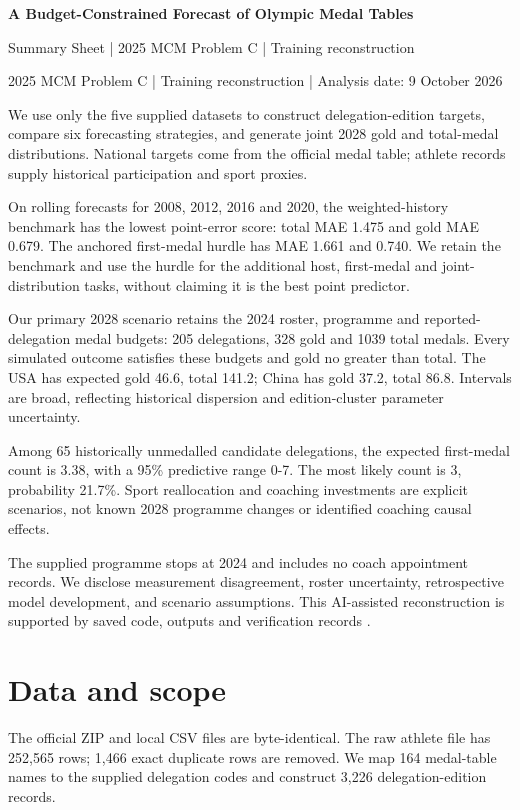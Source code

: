 \documentclass[11pt,a4paper]{article}
\begin{document}
\begin{center}
{\Large\bfseries A Budget-Constrained Forecast of Olympic Medal Tables\par}
\medskip Summary Sheet | 2025 MCM Problem C | Training reconstruction
\end{center}
2025 MCM Problem C | Training reconstruction | Analysis date: 9 October 2026

We use only the five supplied datasets to construct delegation-edition targets, compare six forecasting strategies, and generate joint 2028 gold and total-medal distributions. National targets come from the official medal table; athlete records supply historical participation and sport proxies.

On rolling forecasts for 2008, 2012, 2016 and 2020, the weighted-history benchmark has the lowest point-error score: total MAE 1.475 and gold MAE 0.679. The anchored first-medal hurdle has MAE 1.661 and 0.740. We retain the benchmark and use the hurdle for the additional host, first-medal and joint-distribution tasks, without claiming it is the best point predictor.

Our primary 2028 scenario retains the 2024 roster, programme and reported-delegation medal budgets: 205 delegations, 328 gold and 1039 total medals. Every simulated outcome satisfies these budgets and gold no greater than total. The USA has expected gold 46.6, total 141.2; China has gold 37.2, total 86.8. Intervals are broad, reflecting historical dispersion and edition-cluster parameter uncertainty.

Among 65 historically unmedalled candidate delegations, the expected first-medal count is 3.38, with a 95\% predictive range 0-7. The most likely count is 3, probability 21.7\%. Sport reallocation and coaching investments are explicit scenarios, not known 2028 programme changes or identified coaching causal effects.

The supplied programme stops at 2024 and includes no coach appointment records. We disclose measurement disagreement, roster uncertainty, retrospective model development, and scenario assumptions. This AI-assisted reconstruction is supported by saved code, outputs and verification records \cite{comap-problem,comap-data,nb2-doc}.

\clearpage
\tableofcontents
\clearpage
\section{Data and scope}
The official ZIP and local CSV files are byte-identical. The raw athlete file has 252,565 rows; 1,466 exact duplicate rows are removed. We map 164 medal-table names to the supplied delegation codes and construct 3,226 delegation-edition records.
\end{document}
